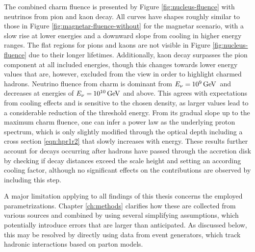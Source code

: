 The combined charm fluence is presented by Figure \ref{fig:nucleus-fluence} with neutrinos from pion and kaon decay. All curves have
shapes roughly similar to those in Figure \ref{fig:magnetar-fluence-without} for the magnetar scenario, with a slow rise at lower
energies and a downward slope from cooling in higher energy ranges. The flat regions for pions and kaons are not visible in Figure
\ref{fig:nucleus-fluence} due to their longer lifetimes. Additionally, kaon decay surpasses the pion component at all included energies,
though this changes towards lower energy values that are, however, excluded from the view in order to highlight charmed hadrons. Neutrino
fluence from charm is dominant from $E_\nu = \kern-0.5pt \qty{e9}{\giga\electronvolt}$~and decreases at energies of
$E_\nu = \kern-0.5pt \qty{e10}{\giga\electronvolt}$ and above. This agrees with expectations from cooling effects and is sensitive
to the chosen density, as larger values lead to a considerable reduction of the threshold energy. From its gradual slope up to the
maximum charm fluence, one can infer a power law as the underlying proton spectrum, which is only slightly modified through the optical
depth including a cross section \eqref{eqn:hpr1r2} that slowly increases with energy. These results further account for decays occurring
after hadrons have passed through the accretion disk by checking if decay distances exceed the scale height and setting an according
cooling factor, although no significant effects on the contributions are observed by including this step.

A major limitation applying to all findings of this thesis concerns the employed parametrizations. Chapter \ref{ch:methods}
clarifies how these are collected from various sources and combined by using several simplifying assumptions, which potentially
introduce errors that are larger than anticipated. As discussed below, this may be resolved by directly using data from event
generators, which track hadronic interactions based on parton models.

\enlargethispage*{\baselineskip}\newpage\null\vfill

\vfill\null\newpage\null\vfill

\vfill\null\newpage
